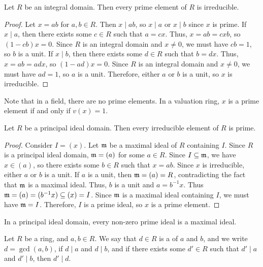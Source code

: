 \begin{proposition}
    Let $R$ be an integral domain. Then every prime element of $R$ is irreducible. 
\end{proposition}

\begin{proof}
    Let $x = ab$ for $a,b \in R$. Then $x \mid ab$, so $x \mid a$ or $x \mid b$ since $x$ is prime. If $x \mid a$, then there exists some $c \in R$ such that $a = cx$. Thus, $x = ab = cxb$, so $(1 - cb)x = 0$. Since $R$ is an integral domain and $x \neq 0$, we must have $cb = 1$, so $b$ is a unit. If $x \mid b$, then there exists some $d \in R$ such that $b = dx$. Thus, $x = ab = adx$, so $(1 - ad)x = 0$. Since $R$ is an integral domain and $x \neq 0$, we must have $ad = 1$, so $a$ is a unit. Therefore, either $a$ or $b$ is a unit, so $x$ is irreducible.
\end{proof}

Note that in a field, there are no prime elements. In a valuation ring, $x$ is a prime element if and only if $v(x) = 1$. 

\begin{proposition}
    Let $R$ be a principal ideal domain. Then every irreducible element of $R$ is prime.
\end{proposition}
\begin{proof}
    Consider $I = (x)$. Let $\mathfrak{m}$ be a maximal ideal of $R$ containing $I$. Since $R$ is a principal ideal domain, $\mathfrak{m} = (a)$ for some $a \in R$. Since $I \subseteq \mathfrak{m}$, we have $x \in (a)$, so there exists some $b \in R$ such that $x = ab$. Since $x$ is irreducible, either $a$ or $b$ is a unit. If $a$ is a unit, then $\mathfrak{m} = (a) = R$, contradicting the fact that $\mathfrak{m}$ is a maximal ideal. Thus, $b$ is a unit and $a = b^{-1}x$. Thus $\mathfrak{m} = (a) = (b^{-1}x) \subseteq (x) = I$. Since $\mathfrak{m}$ is a maximal ideal containing $I$, we must have $\mathfrak{m} = I$. Therefore, $I$ is a prime ideal, so $x$ is a prime element.
\end{proof}

\begin{corollary}
    In a principal ideal domain, every non-zero prime ideal is a maximal ideal.
\end{corollary}

\begin{definition}
    Let $R$ be a ring, and $a,b \in R$. We say that $d \in R$ is a  of $a$ and $b$, and we write $d = \gcd(a,b)$, if $d \mid a$ and $d \mid b$, and if there exists some $d' \in R$ such that $d' \mid a$ and $d' \mid b$, then $d' \mid d$.
\end{definition}

